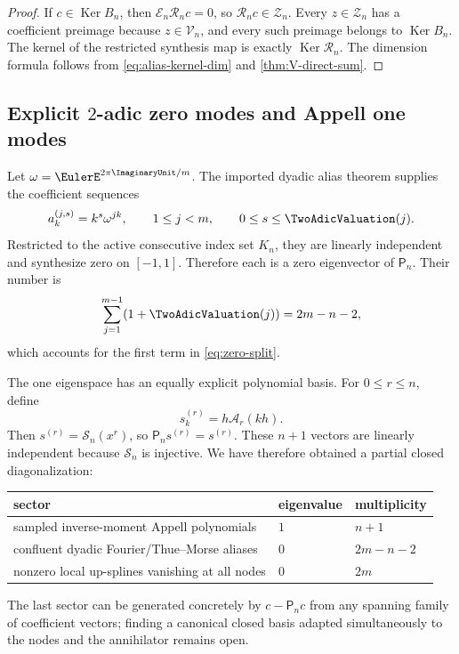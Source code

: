 \documentclass[11pt,oneside]{article}
\numberwithin{equation}{section}
\theoremstyle{definition}
\theoremstyle{remark}
\newcommand{\Ker}{\operatorname{Ker}}
\newcommand{\Eval}{\mathcal E}
\newcommand{\Synth}{\mathcal R}
\newcommand{\Coeff}{\mathcal S}
\newcommand{\Proj}{\mathsf P}
\begin{document}
\begin{proof}
If $c\in\Ker B_n$, then
$\Eval_n\Synth_nc=0$, so $\Synth_nc\in\mathcal Z_n$.  Every
$z\in\mathcal Z_n$ has a coefficient preimage because $z\in\mathcal V_n$,
and every such preimage belongs to $\Ker B_n$.  The kernel of the restricted
synthesis map is exactly $\Ker\Synth_n$.  The dimension formula follows from
\eqref{eq:alias-kernel-dim} and \cref{thm:V-direct-sum}.
\end{proof}

\subsection{Explicit \texorpdfstring{$2$}{2}-adic zero modes and Appell one modes}

Let $\omega=\EulerE^{2\pi\ImaginaryUnit/m}$.  The imported dyadic alias theorem supplies the
coefficient sequences
\begin{equation}
 a^{(j,s)}_k=k^s\omega^{jk},
 \qquad 1\le j<m,
 \qquad 0\le s\le\TwoAdicValuation(j).
 \label{eq:alias-vectors}
\end{equation}
Restricted to the active consecutive index set $K_n$, they are linearly
independent and synthesize zero on $[-1,1]$.  Therefore each is a zero
eigenvector of $\Proj_n$.  Their number is
\begin{equation}
 \sum_{j=1}^{m-1}(1+\TwoAdicValuation(j))=2m-n-2,
 \label{eq:alias-multiplicity-sum}
\end{equation}
which accounts for the first term in \eqref{eq:zero-split}.

The one eigenspace has an equally explicit polynomial basis.  For
$0\le r\le n$, define
\begin{equation}
 s^{(r)}_k=h\mathcal A_r(kh).
 \label{eq:Appell-one-vectors}
\end{equation}
Then $s^{(r)}=\Coeff_n(x^r)$, so
$\Proj_ns^{(r)}=s^{(r)}$.  These $n+1$ vectors are linearly independent
because $\Coeff_n$ is injective.  We have therefore obtained a partial
closed diagonalization:
\begin{center}
\begin{tabular}{@{}lll@{}}
\toprule
sector & eigenvalue & multiplicity \\
\midrule
sampled inverse-moment Appell polynomials & $1$ & $n+1$ \\
confluent dyadic Fourier/Thue--Morse aliases & $0$ & $2m-n-2$ \\
nonzero local up-splines vanishing at all nodes & $0$ & $2m$ \\
\bottomrule
\end{tabular}
\end{center}
The last sector can be generated concretely by
$c-\Proj_nc$ from any spanning family of coefficient vectors; finding a
canonical closed basis adapted simultaneously to the nodes and the
annihilator remains open.
\end{document}
